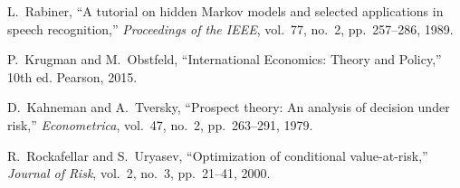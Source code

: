 \documentclass[onecolumn,11pt]{IEEEtran}
\begin{document}
\begin{thebibliography}{12}
L.~Rabiner,
``A tutorial on hidden Markov models and selected applications in speech recognition,''
\emph{Proceedings of the IEEE}, vol.~77, no.~2, pp.~257--286, 1989.

P.~Krugman and M.~Obstfeld,
``International Economics: Theory and Policy,''
10th ed. Pearson, 2015.

D.~Kahneman and A.~Tversky,
``Prospect theory: An analysis of decision under risk,''
\emph{Econometrica}, vol.~47, no.~2, pp.~263--291, 1979.

R.~Rockafellar and S.~Uryasev,
``Optimization of conditional value-at-risk,''
\emph{Journal of Risk}, vol.~2, no.~3, pp.~21--41, 2000.

\end{thebibliography}
\end{document}
